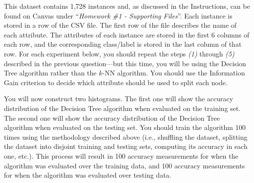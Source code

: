\documentclass{article}
\begin{document}
\noindent This dataset contains 1,728 instances and, as discussed in the Instructions, can be found on Canvas under ``\textit{Homework \#1 - Supporting Files}''. Each instance is stored in a row of the CSV file. The first row of the file describes the name of each attribute. The attributes of each instance are stored in the first 6 columns of each row, and the corresponding class/label is stored in the last column of that row. For each experiment below, you should repeat the steps \textit{(1)} through \textit{(5)} described in the previous question---but this time, you will be using the Decision Tree algorithm rather than the $k$-NN algorithm. You should use the Information Gain criterion to decide which attribute should be used to split each node.
\vspace{0.5cm}

\noindent You will now construct two histograms. The first one will show the accuracy distribution of the Decision Tree algorithm when evaluated on the training set. The second one will show the accuracy distribution of the Decision Tree algorithm when evaluated on the testing set. You should train the algorithm 100 times using the methodology described above (i.e., shuffling the dataset, splitting the dataset into disjoint training and testing sets, computing its accuracy in each one, etc.). This process will result in 100 accuracy measurements for when the algorithm was evaluated over the training data, and 100 accuracy measurements for when the algorithm was evaluated over testing data. 
\end{document}
